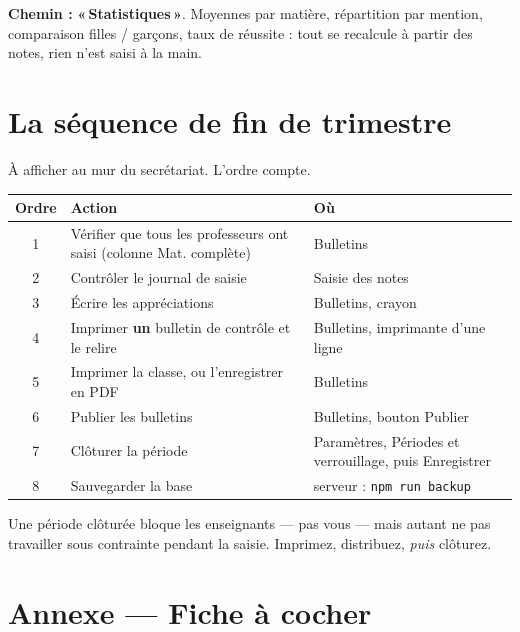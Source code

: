 \documentclass[11pt,a4paper]{article}
\newcommand{\menu}[1]{\textbf{«\,#1\,»}}
\begin{document}
\textbf{Chemin :} \menu{Statistiques}. Moyennes par matière, répartition par
mention, comparaison filles / garçons, taux de réussite : tout se recalcule à
partir des notes, rien n'est saisi à la main.

\newpage

\section{La séquence de fin de trimestre}

À afficher au mur du secrétariat. L'ordre compte.

\begin{center}
\renewcommand{\arraystretch}{1.3}
\begin{tabularx}{\textwidth}{@{}c >{\raggedright}p{6.2cm} X@{}}
\toprule
\textbf{Ordre} & \textbf{Action} & \textbf{Où} \\
\midrule
1 & Vérifier que tous les professeurs ont saisi (colonne Mat. complète) & Bulletins \\
2 & Contrôler le journal de saisie & Saisie des notes \\
3 & Écrire les appréciations & Bulletins, crayon \\
4 & Imprimer \textbf{un} bulletin de contrôle et le relire & Bulletins, imprimante d'une ligne \\
5 & Imprimer la classe, ou l'enregistrer en PDF & Bulletins \\
6 & Publier les bulletins & Bulletins, bouton Publier \\
7 & Clôturer la période & Paramètres, Périodes et verrouillage, puis Enregistrer \\
8 & Sauvegarder la base & serveur : \texttt{npm run backup} \\
\bottomrule
\end{tabularx}
\end{center}

\begin{boiteattention}
Une période clôturée bloque les enseignants — pas vous — mais autant ne pas
travailler sous contrainte pendant la saisie. Imprimez, distribuez, \emph{puis}
clôturez.
\end{boiteattention}

\section{Annexe — Fiche à cocher}
\end{document}

